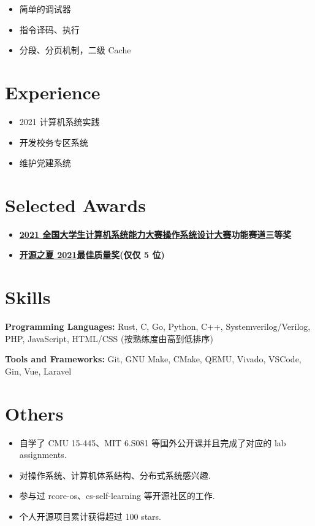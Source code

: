 \documentclass{resume}
\begin{document}
\begin{itemize}
  \item 简单的调试器
  \item 指令译码、执行
  \item 分段、分页机制，二级 Cache
\end{itemize}

\section{Experience}
\begin{itemize}
  \item 2021 计算机系统实践
\end{itemize}

\begin{itemize}
  \item 开发校务专区系统
  \item 维护党建系统
\end{itemize}


\section{Selected Awards}
\begin{itemize}
  \item \textbf{\href{https://os.educg.net/2021CSCC}{2021 全国大学生计算机系统能力大赛操作系统设计大赛}}\quad \textbf{功能赛道三等奖}
  \item \textbf{\href{ https://summer-ospp.ac.cn/ }{开源之夏 2021}}\quad \textbf{最佳质量奖(仅仅 5 位)}
\end{itemize}



\section{Skills}
\textbf{Programming Languages:} \small Rust, C, Go, Python, C++, Systemverilog/Verilog, PHP, JavaScript, HTML/CSS (按熟练度由高到低排序)

\textbf{Tools and Frameworks:} \small Git, GNU Make, CMake, QEMU, Vivado, VSCode, Gin, Vue, Laravel

\section{Others}
\begin{itemize}
  \item 自学了 CMU 15-445、MIT 6.S081 等国外公开课并且完成了对应的 lab assignments.
  \item 对操作系统、计算机体系结构、分布式系统感兴趣.
  \item 参与过 rcore-os、cs-self-learning 等开源社区的工作.
  \item 个人开源项目累计获得超过 100 stars.
\end{itemize}
\end{document}
